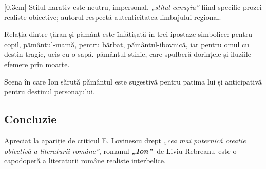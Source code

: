 \documentclass[
12pt,
a4paper
]{article}
\newcommand{\operatitle}{\textbf{\textit{„Ion”\ }}} %
\newcommand{\operaauthor}{Liviu Rebreanu\ } %
\begin{document}
[0.3cm]
Stilul narativ este neutru, impersonal, \textit{„stilul cenușiu”} fiind specific prozei realiste obiective; autorul respectă autenticitatea limbajului regional.

Relația dintre țăran și pământ este înfățișată în trei ipostaze simbolice: pentru copil, pământul-mamă, pentru bărbat, pământul-ibovnică, iar pentru omul cu destin tragic, ucis cu o sapă. pământul-stihie, care spulberă dorințele și iluziile efemere prin moarte.

Scena în care Ion sărută pământul este sugestivă pentru patima lui și anticipativă pentru destinul personajului.

\subsection{Concluzie}

Apreciat la apariție de criticul E. Lovinescu drept \textit{„cea mai puternică creație obiectivă a literaturii române”}, romanul \operatitle de \operaauthor este o capodoperă a literaturii române realiste interbelice.
\end{document}
